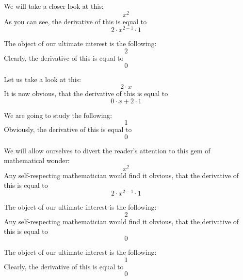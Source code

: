 \documentclass{article}
\begin{document}
We will take a closer look at this:
\begin{equation}
x ^{2 } 
\end{equation}
As you can see, the derivative of this is equal to
\begin{equation}
2 \cdot x ^{2 - 1 } \cdot 1 
\end{equation}

The object of our ultimate interest is the following:
\begin{equation}
2 
\end{equation}
Clearly, the derivative of this is equal to
\begin{equation}
0 
\end{equation}

Let us take a look at this:
\begin{equation}
2 \cdot x 
\end{equation}
It is now obvious, that the derivative of this is equal to
\begin{equation}
0 \cdot x + 2 \cdot 1 
\end{equation}

We are going to study the following:
\begin{equation}
1 
\end{equation}
Obviously, the derivative of this is equal to
\begin{equation}
0 
\end{equation}

We will allow ourselves to divert the reader's attention to this gem of mathematical wonder:
\begin{equation}
x ^{2 } 
\end{equation}
Any self-respecting mathematician would find it obvious, that the derivative of this is equal to
\begin{equation}
2 \cdot x ^{2 - 1 } \cdot 1 
\end{equation}

The object of our ultimate interest is the following:
\begin{equation}
2 
\end{equation}
Any self-respecting mathematician would find it obvious, that the derivative of this is equal to
\begin{equation}
0 
\end{equation}

The object of our ultimate interest is the following:
\begin{equation}
1 
\end{equation}
Clearly, the derivative of this is equal to
\begin{equation}
0 
\end{equation}
\end{document}
